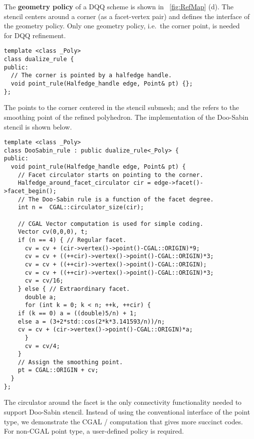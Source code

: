 \noindent The \textbf{geometry policy} of a DQQ scheme is shown in
\figurename\ \ref{fig:RefMap} (d). The stencil centers around
a corner (as a facet-vertex pair) and defines the interface 
of the geometry policy. Only one geometry policy, i.e.\ the corner 
point, is needed for DQQ refinement. 
\begin{lstlisting}
template <class _Poly>
class dualize_rule {
public:
  // The corner is pointed by a halfedge handle.
  void point_rule(Halfedge_handle edge, Point& pt) {};
};
\end{lstlisting}
The  points to the 
corner centered in the stencil submesh; and the 
 refers to the smoothing point
of the refined polyhedron. The implementation of the
Doo-Sabin stencil is shown below.
\begin{lstlisting}
template <class _Poly>
class DooSabin_rule : public dualize_rule<_Poly> {
public:
  void point_rule(Halfedge_handle edge, Point& pt) {
    // Facet circulator starts on pointing to the corner. 
    Halfedge_around_facet_circulator cir = edge->facet()->facet_begin();
    // The Doo-Sabin rule is a function of the facet degree.
    int n =  CGAL::circulator_size(cir);

    // CGAL Vector computation is used for simple coding.
    Vector cv(0,0,0), t;
    if (n == 4) { // Regular facet.
      cv = cv + (cir->vertex()->point()-CGAL::ORIGIN)*9;
      cv = cv + ((++cir)->vertex()->point()-CGAL::ORIGIN)*3;
      cv = cv + ((++cir)->vertex()->point()-CGAL::ORIGIN);
      cv = cv + ((++cir)->vertex()->point()-CGAL::ORIGIN)*3;
      cv = cv/16;
    } else { // Extraordinary facet.
      double a;
      for (int k = 0; k < n; ++k, ++cir) {
	if (k == 0) a = ((double)5/n) + 1;
	else a = (3+2*std::cos(2*k*3.141593/n))/n;
	cv = cv + (cir->vertex()->point()-CGAL::ORIGIN)*a;
      }
      cv = cv/4;
    }
    // Assign the smoothing point.
    pt = CGAL::ORIGIN + cv;
  }
};
\end{lstlisting}
The circulator around the facet is the only connectivity
functionality needed to support Doo-Sabin stencil.
Instead of using the conventional interface \CodeFmt{[i]} 
of the point type, we demonstrate the CGAL 
/ computation that gives
more succinct codes. For non-CGAL point type, a user-defined 
policy is required. 
\\

